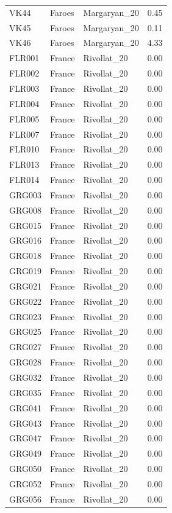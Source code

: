 \begin{longtable}[t]{lllr}
VK44 & Faroes & Margaryan\_20 & 0.45\\
VK45 & Faroes & Margaryan\_20 & 0.11\\
VK46 & Faroes & Margaryan\_20 & 4.33\\
FLR001 & France & Rivollat\_20 & 0.00\\
FLR002 & France & Rivollat\_20 & 0.00\\
FLR003 & France & Rivollat\_20 & 0.00\\
FLR004 & France & Rivollat\_20 & 0.00\\
FLR005 & France & Rivollat\_20 & 0.00\\
FLR007 & France & Rivollat\_20 & 0.00\\
FLR010 & France & Rivollat\_20 & 0.00\\
FLR013 & France & Rivollat\_20 & 0.00\\
FLR014 & France & Rivollat\_20 & 0.00\\
GRG003 & France & Rivollat\_20 & 0.00\\
GRG008 & France & Rivollat\_20 & 0.00\\
GRG015 & France & Rivollat\_20 & 0.00\\
GRG016 & France & Rivollat\_20 & 0.00\\
GRG018 & France & Rivollat\_20 & 0.00\\
GRG019 & France & Rivollat\_20 & 0.00\\
GRG021 & France & Rivollat\_20 & 0.00\\
GRG022 & France & Rivollat\_20 & 0.00\\
GRG023 & France & Rivollat\_20 & 0.00\\
GRG025 & France & Rivollat\_20 & 0.00\\
GRG027 & France & Rivollat\_20 & 0.00\\
GRG028 & France & Rivollat\_20 & 0.00\\
GRG032 & France & Rivollat\_20 & 0.00\\
GRG035 & France & Rivollat\_20 & 0.00\\
GRG041 & France & Rivollat\_20 & 0.00\\
GRG043 & France & Rivollat\_20 & 0.00\\
GRG047 & France & Rivollat\_20 & 0.00\\
GRG049 & France & Rivollat\_20 & 0.00\\
GRG050 & France & Rivollat\_20 & 0.00\\
GRG052 & France & Rivollat\_20 & 0.00\\
GRG056 & France & Rivollat\_20 & 0.00\\

\end{longtable}

